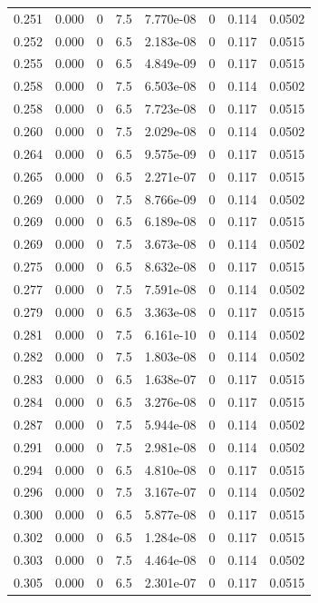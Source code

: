 \documentclass[preview]{standalone}
\begin{document}
{{{{\begin{tabular}{L{1.2cm}C{1.2cm} C{0.3cm}C{0.5cm} C{1.4cm}C{1.4cm} C{1.4cm}C{1.4cm}}
  0.251  &  0.000  & 0     & 7.5 &  7.770e-08  & 0  & 0.114 &  0.0502   \\ 
  0.252  &  0.000  & 0     & 6.5 &  2.183e-08  & 0  & 0.117 &  0.0515   \\ 
  0.255  &  0.000  & 0     & 6.5 &  4.849e-09  & 0  & 0.117 &  0.0515   \\ 
  0.258  &  0.000  & 0     & 7.5 &  6.503e-08  & 0  & 0.114 &  0.0502   \\ 
  0.258  &  0.000  & 0     & 6.5 &  7.723e-08  & 0  & 0.117 &  0.0515   \\ 
  0.260  &  0.000  & 0     & 7.5 &  2.029e-08  & 0  & 0.114 &  0.0502   \\ 
  0.264  &  0.000  & 0     & 6.5 &  9.575e-09  & 0  & 0.117 &  0.0515   \\ 
  0.265  &  0.000  & 0     & 6.5 &  2.271e-07  & 0  & 0.117 &  0.0515   \\ 
  0.269  &  0.000  & 0     & 7.5 &  8.766e-09  & 0  & 0.114 &  0.0502   \\ 
  0.269  &  0.000  & 0     & 6.5 &  6.189e-08  & 0  & 0.117 &  0.0515   \\ 
  0.269  &  0.000  & 0     & 7.5 &  3.673e-08  & 0  & 0.114 &  0.0502   \\ 
  0.275  &  0.000  & 0     & 6.5 &  8.632e-08  & 0  & 0.117 &  0.0515   \\ 
  0.277  &  0.000  & 0     & 7.5 &  7.591e-08  & 0  & 0.114 &  0.0502   \\ 
  0.279  &  0.000  & 0     & 6.5 &  3.363e-08  & 0  & 0.117 &  0.0515   \\ 
  0.281  &  0.000  & 0     & 7.5 &  6.161e-10  & 0  & 0.114 &  0.0502   \\ 
  0.282  &  0.000  & 0     & 7.5 &  1.803e-08  & 0  & 0.114 &  0.0502   \\ 
  0.283  &  0.000  & 0     & 6.5 &  1.638e-07  & 0  & 0.117 &  0.0515   \\ 
  0.284  &  0.000  & 0     & 6.5 &  3.276e-08  & 0  & 0.117 &  0.0515   \\ 
  0.287  &  0.000  & 0     & 7.5 &  5.944e-08  & 0  & 0.114 &  0.0502   \\ 
  0.291  &  0.000  & 0     & 7.5 &  2.981e-08  & 0  & 0.114 &  0.0502   \\ 
  0.294  &  0.000  & 0     & 6.5 &  4.810e-08  & 0  & 0.117 &  0.0515   \\ 
  0.296  &  0.000  & 0     & 7.5 &  3.167e-07  & 0  & 0.114 &  0.0502   \\ 
  0.300  &  0.000  & 0     & 6.5 &  5.877e-08  & 0  & 0.117 &  0.0515   \\ 
  0.302  &  0.000  & 0     & 6.5 &  1.284e-08  & 0  & 0.117 &  0.0515   \\ 
  0.303  &  0.000  & 0     & 7.5 &  4.464e-08  & 0  & 0.114 &  0.0502   \\ 
  0.305  &  0.000  & 0     & 6.5 &  2.301e-07  & 0  & 0.117 &  0.0515   \\ 
\hline 
\end{tabular} 

}}}}
\end{document}
